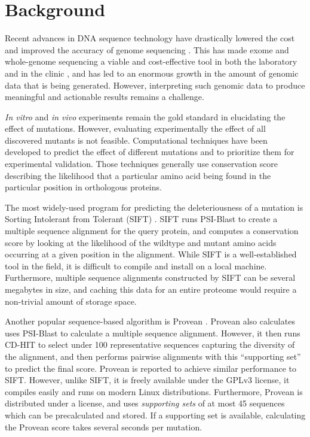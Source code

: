 

\section{Background}

Recent advances in DNA sequence technology have drastically lowered the cost and improved the accuracy of genome sequencing \cite{wetterstrand_dna_2016}. This has made exome and whole-genome sequencing a viable and cost-effective tool in both the laboratory and in the clinic \cite{chrystoja_whole_2014}, and has led to an enormous growth in the amount of genomic data that is being generated. However, interpreting such genomic data to produce meaningful and actionable results remains a challenge.

\textit{In vitro} and \textit{in vivo} experiments remain the gold standard in elucidating the effect of mutations. However, evaluating experimentally the effect of all discovered mutants is not feasible. Computational techniques have been developed to predict the effect of different mutations and to prioritize them for experimental validation. Those techniques generally use conservation score describing the likelihood that a particular amino acid being found in the particular position in orthologous proteins.

The most widely-used program for predicting the deleteriousness of a mutation is Sorting Intolerant from Tolerant (SIFT) \cite{ng_sift:_2003}. SIFT runs PSI-Blast to create a multiple sequence alignment for the query protein, and computes a conservation score by looking at the likelihood of the wildtype and mutant amino acids occurring at a given position in the alignment. While SIFT is a well-established tool in the field, it is difficult to compile and install on a local machine. Furthermore, multiple sequence alignments constructed by SIFT can be several megabytes in size, and caching this data for an entire proteome would require a non-trivial amount of storage space.

Another popular sequence-based algorithm is Provean \cite{choi_predicting_2012}. Provean also calculates uses PSI-Blast to calculate a multiple sequence alignment. However, it then runs CD-HIT to select under 100 representative sequences capturing the diversity of the alignment, and then performs pairwise alignments with this ``supporting set'' to predict the final score. Provean is reported to achieve similar performance to SIFT. However, unlike SIFT, it is freely available under the GPLv3 license, it compiles easily and runs on modern Linux distributions. Furthermore, Provean is distributed under a  license, and uses \textit{supporting sets} of at most 45 sequences which can be precalculated and stored. If a supporting set is available, calculating the Provean score takes several seconds per mutation.

